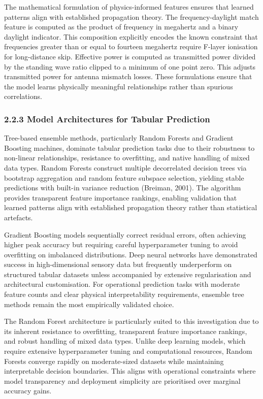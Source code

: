 The mathematical formulation of physics-informed features ensures that
learned patterns align with established propagation theory. The
frequency-daylight match feature is computed as the product of frequency
in megahertz and a binary daylight indicator. This composition
explicitly encodes the known constraint that frequencies greater than or
equal to fourteen megahertz require F-layer ionisation for long-distance
skip. Effective power is computed as transmitted power divided by the
standing wave ratio clipped to a minimum of one point zero. This adjusts
transmitted power for antenna mismatch losses. These formulations ensure
that the model learns physically meaningful relationships rather than
spurious correlations.

\subsubsection{2.2.3 Model Architectures for Tabular
Prediction}\label{model-architectures-for-tabular-prediction}

Tree-based ensemble methods, particularly Random Forests and Gradient
Boosting machines, dominate tabular prediction tasks due to their
robustness to non-linear relationships, resistance to overfitting, and
native handling of mixed data types. Random Forests construct multiple
decorrelated decision trees via bootstrap aggregation and random feature
subspace selection, yielding stable predictions with built-in variance
reduction (Breiman, 2001). The algorithm provides transparent feature
importance rankings, enabling validation that learned patterns align
with established propagation theory rather than statistical artefacts.

Gradient Boosting models sequentially correct residual errors, often
achieving higher peak accuracy but requiring careful hyperparameter
tuning to avoid overfitting on imbalanced distributions. Deep neural
networks have demonstrated success in high-dimensional sensory data but
frequently underperform on structured tabular datasets unless
accompanied by extensive regularisation and architectural customisation.
For operational prediction tasks with moderate feature counts and clear
physical interpretability requirements, ensemble tree methods remain the
most empirically validated choice.

The Random Forest architecture is particularly suited to this
investigation due to its inherent resistance to overfitting, transparent
feature importance rankings, and robust handling of mixed data types.
Unlike deep learning models, which require extensive hyperparameter
tuning and computational resources, Random Forests converge rapidly on
moderate-sized datasets while maintaining interpretable decision
boundaries. This aligns with operational constraints where model
transparency and deployment simplicity are prioritised over marginal
accuracy gains.

